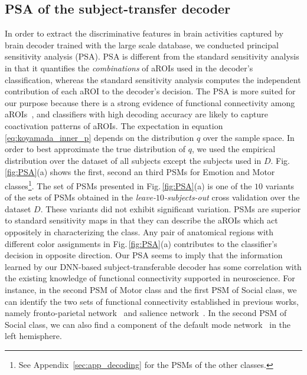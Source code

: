 \subsection{PSA of the subject-transfer decoder}
\label{PSA_of_dnn_decoder}
In order to extract the discriminative features in brain activities captured by brain decoder trained with the large scale database, we conducted principal sensitivity analysis (PSA).
%
PSA is different from the standard sensitivity analysis in that it quantifies the \textit{combinations} of aROIs used in the decoder's classification, whereas the standard sensitivity analysis computes the independent contribution of each aROI to the decoder's decision.
%
The PSA is more suited for our purpose because there is a strong evidence of functional connectivity among aROIs~\cite{Buckner2013, Cole2014}, and classifiers with high decoding accuracy are likely to capture coactivation patterns of aROIs.
The expectation in equation\,\eqref{eq:koyamada_inner_p} depends on the distribution $q$ over the sample space.
%
In order to best approximate the true distribution of $q$, we used the empirical distribution over the dataset of all subjects except the subjects used in $D$.
Fig.\,\ref{fig:PSA}(a) shows the first, second an third PSMs for Emotion and Motor classes\footnote{See Appendix~\ref{sec:app_decoding} for the PSMs of the other classes.}.
%
The set of PSMs presented in Fig.\,\ref{fig:PSA}(a) is one of the $10$ variants of the sets of PSMs obtained in the \textit{leave-$10$-subjects-out} cross validation over the dataset $D$.
%
These variants did not exhibit significant variation.
%
PSMs are superior to standard sensitivity maps in that they can describe the aROIs which act oppositely in characterizing the class.
%
Any pair of anatomical regions with different color assignments in Fig.\,\ref{fig:PSA}(a) contributes to the classifier's decision in opposite direction.
%
Our PSA seems to imply that the information learned by our DNN-based subject-transferable decoder has some correlation with the existing knowledge of functional connectivity supported in neuroscience.
%
For instance,  in the second PSM of Motor class and the first PSM of Social class,
we can identify the two sets of functional connectivity established in previous works, namely fronto-parietal network~\cite{cole2013multi} and salience network~\cite{taylor2009two}.
%
In the second PSM of Social class, we can also find a component of the default mode network~\cite{raichle2007default, raichle2001default} in the left hemisphere.
